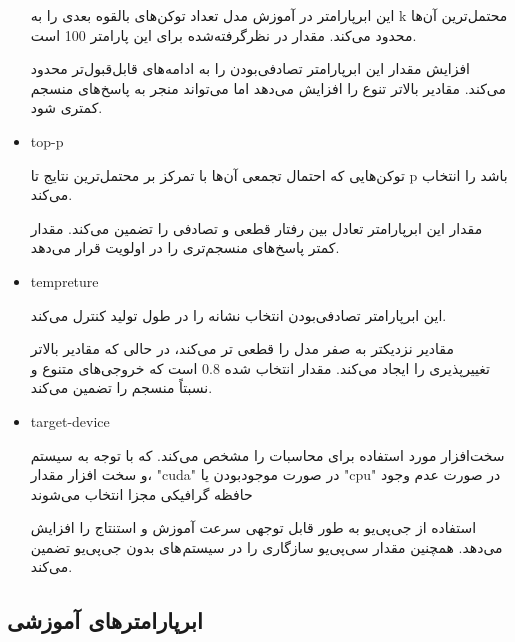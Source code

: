 \begin{itemize}
 این ابرپارامتر در آموزش مدل تعداد توکن‌های بالقوه بعدی را به k محتمل‌ترین آن‌ها محدود می‌کند. مقدار در نظرگرفته‌شده برای این پارامتر 100 است.

افزایش مقدار این ابرپارامتر تصادفی‌بودن را به ادامه‌های قابل‌قبول‌تر محدود می‌کند. مقادیر بالاتر تنوع را افزایش می‌دهد اما می‌تواند منجر به پاسخ‌های منسجم کمتری شود.
\item
top-p

توکن‌هایی که احتمال تجمعی آن‌ها با تمرکز بر محتمل‌ترین نتایج تا p باشد را انتخاب می‌کند.

مقدار این ابرپارامتر تعادل بین رفتار قطعی و تصادفی را تضمین می‌کند. مقدار کمتر پاسخ‌های منسجم‌تری را در اولویت قرار می‌دهد.
\item
tempreture

این ابرپارامتر تصادفی‌بودن انتخاب نشانه را در طول تولید کنترل می‌کند.

مقادیر نزدیکتر به صفر مدل را قطعی تر می‌کند، در حالی که مقادیر بالاتر تغییرپذیری را ایجاد می‌کند. مقدار انتخاب شده
\num{0.8}
 است که خروجی‌های متنوع و نسبتاً منسجم را تضمین می‌کند.
\item
 target-device

سخت‌افزار مورد استفاده برای محاسبات را مشخص می‌کند. که با توجه به سیستم و سخت افزار  مقدار، "cuda" در صورت موجود‌بودن یا "cpu" در صورت عدم وجود حافظه گرافیکی مجزا انتخاب می‌شوند

 استفاده از جی‌پی‌یو به طور قابل توجهی سرعت آموزش و استنتاج را افزایش می‌دهد. همچنین مقدار سی‌پی‌یو سازگاری را در سیستم های بدون جی‌پی‌یو تضمین می‌کند.
\end{itemize}

\subsection{ابرپارامترهای آموزشی}

